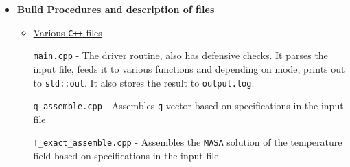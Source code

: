 \documentclass[12 pt, final]{article}
\begin{document}
\begin{itemize}
\begin{itemize}
\begin{itemize}
            \begin{table}[H] %
            \\
            \end{table}    
        \end{itemize}
    \end{itemize}
    \item \textbf{Build Procedures and description of files}
    \begin{itemize}
        \item \underline{Various \texttt{C++} files}
        
        \texttt{main.cpp} - The driver routine, also has defensive checks. It parses the input file, feeds it to various functions and depending on mode, prints out to \texttt{std::out}. It also stores the result to \texttt{output.log}.
        
        \texttt{q\_assemble.cpp} - Assembles \texttt{q} vector based on specifications in the input file
        
        \texttt{T\_exact\_assemble.cpp} - Assembles the \texttt{MASA} solution of the temperature field based on specifications in the input file


\end{itemize}
\end{itemize}
\end{document}
